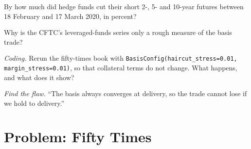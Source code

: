 \begin{exercise}[$\star\star$]\label{exo:s2:the-bond-futures-basis-trade:5}
By how much did hedge funds cut their short 2-, 5- and 10-year futures between 18 February and 17 March 2020, in percent?
\end{exercise}

\begin{exercise}[$\star\star$]\label{exo:s2:the-bond-futures-basis-trade:6}
Why is the CFTC's leveraged-funds series only a rough measure of the basis trade?
\end{exercise}

\begin{exercise}[$\star\star\star$]\label{exo:s2:the-bond-futures-basis-trade:7}
\emph{Coding.} Rerun the fifty-times book with \texttt{BasisConfig(haircut\_stress=0.01, margin\_stress=0.01)}, so that collateral terms do not
change. What happens, and what does it show?
\end{exercise}

\begin{exercise}[$\star\star\star$]\label{exo:s2:the-bond-futures-basis-trade:8}
\emph{Find the flaw.} ``The basis always converges at delivery, so the trade cannot lose if we hold to delivery.''
\end{exercise}

\section{Problem: Fifty Times}

